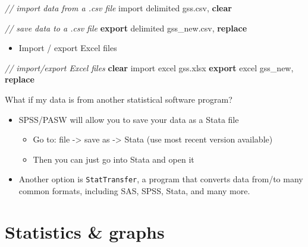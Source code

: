 \documentclass[
]{book}
\newenvironment{Shaded}{\begin{snugshade}}{\end{snugshade}}
\newcommand{\CommentTok}[1]{\textcolor[rgb]{0.56,0.35,0.01}{\textit{#1}}}
\newcommand{\KeywordTok}[1]{\textcolor[rgb]{0.13,0.29,0.53}{\textbf{#1}}}
\newcommand{\NormalTok}[1]{#1}
\providecommand{\tightlist}{%
  \setlength{\itemsep}{0pt}\setlength{\parskip}{0pt}}
\begin{document}
\begin{Shaded}
\begin{Highlighting}[]
\CommentTok{// import data from a .csv file}
\NormalTok{import delimited gss.csv, }\KeywordTok{clear}

\CommentTok{// save data to a .csv file}
\KeywordTok{export}\NormalTok{ delimited gss\_new.csv, }\KeywordTok{replace}
\end{Highlighting}
\end{Shaded}

\begin{itemize}
\tightlist
\item
  Import / export Excel files
\end{itemize}

\begin{Shaded}
\begin{Highlighting}[]
\CommentTok{// import/export Excel files}
\KeywordTok{clear}
\NormalTok{import excel gss.xlsx}
\KeywordTok{export}\NormalTok{ excel gss\_new, }\KeywordTok{replace}
\end{Highlighting}
\end{Shaded}

What if my data is from another statistical software program?

\begin{itemize}
\tightlist
\item
  SPSS/PASW will allow you to save your data as a Stata file

  \begin{itemize}
  \tightlist
  \item
    Go to: file -\textgreater{} save as -\textgreater{} Stata (use most recent version available)
  \item
    Then you can just go into Stata and open it
  \end{itemize}
\item
  Another option is \texttt{StatTransfer}, a program that converts data from/to many common formats, including SAS, SPSS, Stata, and many more.
\end{itemize}

\hypertarget{statistics-graphs}{%
\section{Statistics \& graphs}\label{statistics-graphs}}
\end{document}

